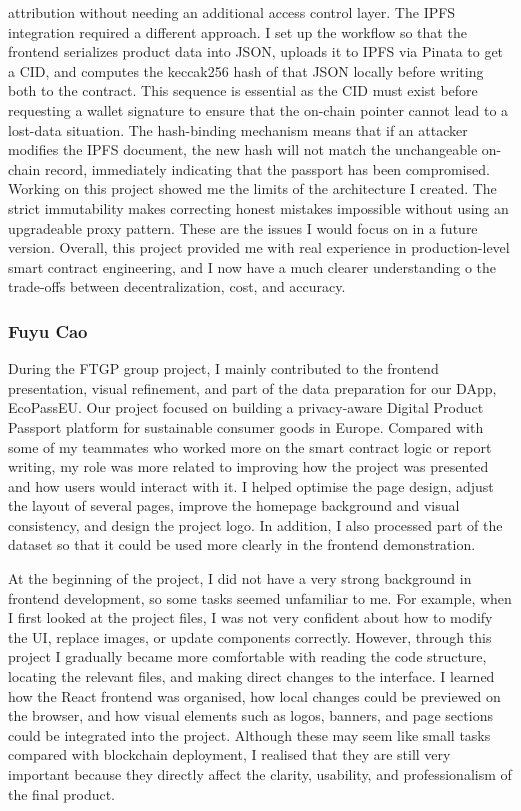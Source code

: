 \documentclass[runningheads]{llncs}
\begin{document}
	attribution without needing an additional access control layer. The IPFS integration required a different approach. I set up the workflow so that the frontend
	serializes product data into JSON, uploads it to IPFS via Pinata to get a CID, and computes the keccak256 hash of that JSON locally before writing both to the
	contract. This sequence is essential as the CID must exist before requesting a wallet signature to ensure that the on-chain pointer cannot lead to a lost-data
	situation. The hash-binding mechanism means that if an attacker modifies the IPFS document, the new hash will not match the unchangeable on-chain record,
	immediately indicating that the passport has been compromised. Working on this project showed me the limits of the architecture I created. The strict
	immutability makes correcting honest mistakes impossible without using an upgradeable proxy pattern. These are the issues I would focus on in a future
	version. Overall, this project provided me with real experience in production-level smart contract engineering, and I now have a much clearer understanding o
	the trade-offs between decentralization, cost, and accuracy.
	
	\subsubsection{Fuyu Cao}
	During the FTGP group project, I mainly contributed to the frontend presentation, visual refinement, and part of the data preparation for our DApp, EcoPassEU. Our project focused on building a privacy-aware Digital Product Passport platform for sustainable consumer goods in Europe. Compared with some of my teammates who worked more on the smart contract logic or report writing, my role was more related to improving how the project was presented and how users would interact with it. I helped optimise the page design, adjust the layout of several pages, improve the homepage background and visual consistency, and design the project logo. In addition, I also processed part of the dataset so that it could be used more clearly in the frontend demonstration.
	
	At the beginning of the project, I did not have a very strong background in frontend development, so some tasks seemed unfamiliar to me. For example, when I first looked at the project files, I was not very confident about how to modify the UI, replace images, or update components correctly. However, through this project I gradually became more comfortable with reading the code structure, locating the relevant files, and making direct changes to the interface. I learned how the React frontend was organised, how local changes could be previewed on the browser, and how visual elements such as logos, banners, and page sections could be integrated into the project. Although these may seem like small tasks compared with blockchain deployment, I realised that they are still very important because they directly affect the clarity, usability, and professionalism of the final product.
	
\end{document}
